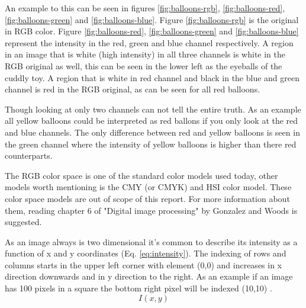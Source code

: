 An example to this can be seen in figures \ref{fig:balloons-rgb},
\ref{fig:balloons-red}, \ref{fig:balloons-green} and \ref{fig:balloons-blue}.
Figure \ref{fig:balloons-rgb} is the original in RGB color. Figure \ref{fig:balloons-red},
\ref{fig:balloons-green} and \ref{fig:balloons-blue} represent the intensity in the red,
green and blue channel respectively. A region in an image that is white (high
intensity) in all three channels is white in the RGB original as well, this can
be seen in the lower left as the eyeballs of the cuddly toy. A region that is white
in red channel and black in the blue and green channel is red in the RGB original, as
can be seen for all red balloons.

Though looking at only two channels can not tell the entire truth. As an example all
yellow balloons could be interpreted as red ballons if you only look at the
red and blue channels. The only difference between red and yellow balloons is
seen in the green channel where the intensity of yellow balloons is higher than
there red counterparts.

The RGB color space is one of the standard color models used today, other models
worth mentioning is the CMY (or CMYK) and HSI color model. These color space
models are out of scope of this report. For more information about them,
reading chapter 6 of "Digital image processing" by Gonzalez and Woods \cite{gonzalez2008} is suggested.

As an image always is two dimensional it's common to describe its intensity as
a function of x and y coordinates (Eq. \ref{eq:intensity}). The indexing of
rows and columns starts in the upper left corner with element (0,0) and increases
in x direction downwards and in y direction to the right. As an example if an
image has 100 pixels in a square the bottom right pixel will be indexed (10,10) \cite{gonzalez2008}.
\begin{equation}
    \label{eq:intensity}
    I(x,y)
\end{equation}

